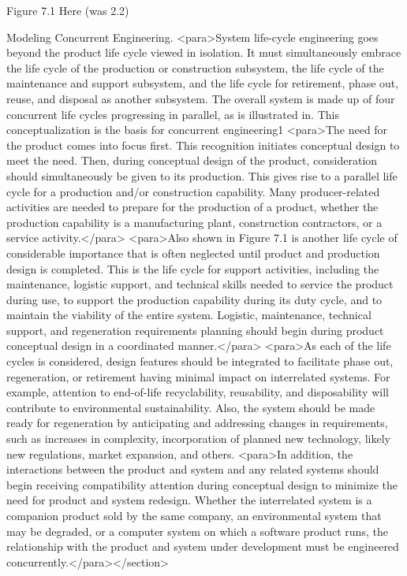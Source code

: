 Figure 7.1 Here (was 2.2) 

Modeling Concurrent Engineering. <para>System life-cycle engineering goes beyond the product life cycle viewed in isolation. It must simultaneously embrace the life cycle of the production or construction subsystem, the life cycle of the maintenance and support subsystem, and the life cycle for retirement, phase out, reuse, and disposal as another subsystem. The overall system is made up of four concurrent life cycles progressing in parallel, as is illustrated in. This conceptualization is the basis for concurrent engineering1
<para>The need for the product comes into focus first. This recognition initiates conceptual design to meet the need. Then, during conceptual design of the product, consideration should simultaneously be given to its production. This gives rise to a parallel life cycle for a production and/or construction capability. Many producer-related activities are needed to prepare for the production of a product, whether the production capability is a manufacturing plant, construction contractors, or a service activity.</para>
<para>Also shown in Figure 7.1 is another life cycle of considerable importance that is often neglected until product and production design is completed. This is the life cycle for support activities, including the maintenance, logistic support, and technical skills needed to service the product during use, to support the production capability during its duty cycle, and to maintain the viability of the entire system. Logistic, maintenance, technical support, and regeneration requirements planning should begin during product conceptual design in a coordinated manner.</para>
<para>As each of the life cycles is considered, design features should be integrated to facilitate phase out, regeneration, or retirement having minimal impact on interrelated systems. For example, attention to end-of-life recyclability, reusability, and disposability will contribute to environmental sustainability. Also, the system should be made ready for regeneration by anticipating and addressing changes in requirements, such as increases in complexity, incorporation of planned new technology, likely new regulations, market expansion, and others.
<para>In addition, the interactions between the product and system and any related systems should begin receiving compatibility attention during conceptual design to minimize the need for product and system redesign. Whether the interrelated system is a companion product sold by the same company, an environmental system that may be degraded, or a computer system on which a software product runs, the relationship with the product and system under development must be engineered concurrently.</para></section>
